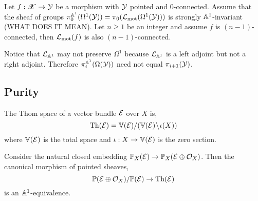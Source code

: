 \documentclass[12pt]{article}
\begin{document}
\begin{theorem}[Mor12, 6.56]
Let $f : \mathscr{X} \to \mathcal{Y}$ be a morphism with $\mathcal{Y}$ pointed and $0$-connected. Assume that the sheaf of groups $\pi_0^{\mathbb{A}^1}(\Omega^1(\mathcal{Y})) = \pi_0(\mathcal{L}_{\text{mot}}(\Omega^1(\mathcal{Y})))$ is strongly $\mathbb{A}^1$-invariant (WHAT DOES IT MEAN). Let $n \ge 1$ be an integer and assume $f$ is $(n-1)$-connected, then $\mathcal{L}_{\text{mot}}(f)$ is also $(n-1)$-connected. 
\end{theorem}

\begin{rmk}
Notice that $\mathcal{L}_{\mathbb{A}^1}$ may not preserve $\Omega^1$ because $\mathcal{L}_{\mathbb{A}^1}$ is a left adjoint but not a right adjoint. Therefore $\pi_i^{\mathbb{A}^1}(\Omega(\mathcal{Y}))$ need not equal $\pi_{i+1}(\mathcal{Y})$.
\end{rmk}

\subsection{Purity}

\newcommand{\Th}{\mathrm{Th}}
\newcommand{\cN}{\mathcal{N}}

\begin{defn}
The Thom space of a vector bundle $\mathcal{E}$ over $X$ is,
\[ \Th(\E) = \V(\E)  / (\V(\E) \sm \iota(X)) \]
where $\mathbb{V}(\mathcal{E})$ is the total space and $\iota : X \to \mathbb{V}(\mathcal{E})$ is the zero section.
\end{defn}

\begin{lemma}
Consider the natural closed embedding $\mathbb{P}_X(\mathcal{E}) \to \mathbb{P}_X(\mathcal{E} \oplus \mathcal{O}_{X})$. Then the canonical morphism of pointed sheaves,
\[ \P(\E \oplus \struct{X}) / \P(\E) \to \Th(\E) \]
is an $\mathbb{A}^1$-equivalence. 
\end{lemma}
\end{document}
